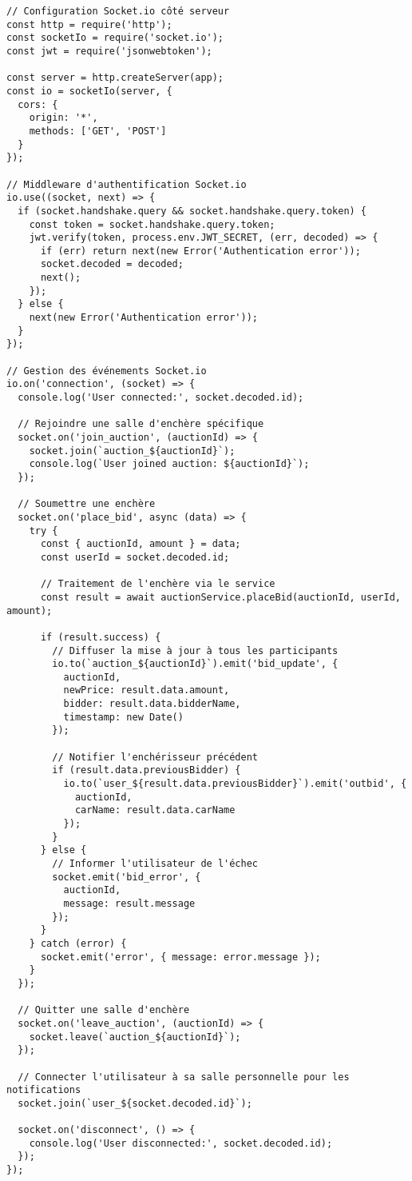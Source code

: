 \begin{verbatim}
// Configuration Socket.io côté serveur
const http = require('http');
const socketIo = require('socket.io');
const jwt = require('jsonwebtoken');

const server = http.createServer(app);
const io = socketIo(server, {
  cors: {
    origin: '*',
    methods: ['GET', 'POST']
  }
});

// Middleware d'authentification Socket.io
io.use((socket, next) => {
  if (socket.handshake.query && socket.handshake.query.token) {
    const token = socket.handshake.query.token;
    jwt.verify(token, process.env.JWT_SECRET, (err, decoded) => {
      if (err) return next(new Error('Authentication error'));
      socket.decoded = decoded;
      next();
    });
  } else {
    next(new Error('Authentication error'));
  }
});

// Gestion des événements Socket.io
io.on('connection', (socket) => {
  console.log('User connected:', socket.decoded.id);
  
  // Rejoindre une salle d'enchère spécifique
  socket.on('join_auction', (auctionId) => {
    socket.join(`auction_${auctionId}`);
    console.log(`User joined auction: ${auctionId}`);
  });
  
  // Soumettre une enchère
  socket.on('place_bid', async (data) => {
    try {
      const { auctionId, amount } = data;
      const userId = socket.decoded.id;
      
      // Traitement de l'enchère via le service
      const result = await auctionService.placeBid(auctionId, userId, amount);
      
      if (result.success) {
        // Diffuser la mise à jour à tous les participants
        io.to(`auction_${auctionId}`).emit('bid_update', {
          auctionId,
          newPrice: result.data.amount,
          bidder: result.data.bidderName,
          timestamp: new Date()
        });
        
        // Notifier l'enchérisseur précédent
        if (result.data.previousBidder) {
          io.to(`user_${result.data.previousBidder}`).emit('outbid', {
            auctionId,
            carName: result.data.carName
          });
        }
      } else {
        // Informer l'utilisateur de l'échec
        socket.emit('bid_error', {
          auctionId,
          message: result.message
        });
      }
    } catch (error) {
      socket.emit('error', { message: error.message });
    }
  });
  
  // Quitter une salle d'enchère
  socket.on('leave_auction', (auctionId) => {
    socket.leave(`auction_${auctionId}`);
  });
  
  // Connecter l'utilisateur à sa salle personnelle pour les notifications
  socket.join(`user_${socket.decoded.id}`);
  
  socket.on('disconnect', () => {
    console.log('User disconnected:', socket.decoded.id);
  });
});
\end{verbatim}

